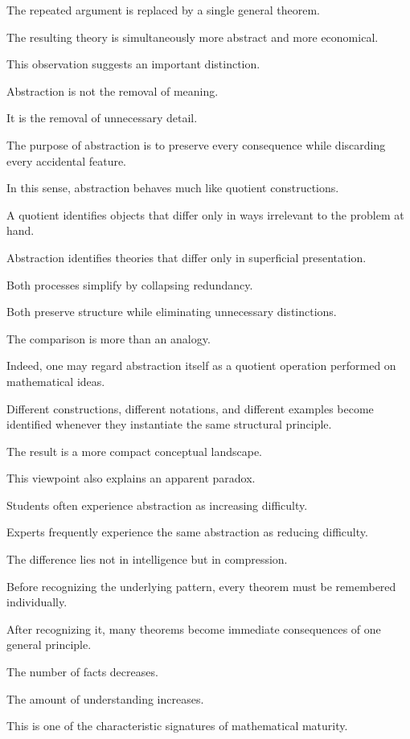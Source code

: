 \documentclass[11pt]{book}
\numberwithin{equation}{chapter}
\theoremstyle{definition}
\theoremstyle{plain}
\theoremstyle{remark}
\begin{document}
The repeated argument is replaced by a single general theorem.

The resulting theory is simultaneously more abstract and more economical.

This observation suggests an important distinction.

Abstraction is not the removal of meaning.

It is the removal of unnecessary detail.

The purpose of abstraction is to preserve every consequence while discarding every accidental feature.

In this sense, abstraction behaves much like quotient constructions.

A quotient identifies objects that differ only in ways irrelevant to the problem at hand.

Abstraction identifies theories that differ only in superficial presentation.

Both processes simplify by collapsing redundancy.

Both preserve structure while eliminating unnecessary distinctions.

The comparison is more than an analogy.

Indeed, one may regard abstraction itself as a quotient operation performed on mathematical ideas.

Different constructions, different notations, and different examples become identified whenever they instantiate the same structural principle.

The result is a more compact conceptual landscape.

This viewpoint also explains an apparent paradox.

Students often experience abstraction as increasing difficulty.

Experts frequently experience the same abstraction as reducing difficulty.

The difference lies not in intelligence but in compression.

Before recognizing the underlying pattern, every theorem must be remembered individually.

After recognizing it, many theorems become immediate consequences of one general principle.

The number of facts decreases.

The amount of understanding increases.

This is one of the characteristic signatures of mathematical maturity.
\end{document}
